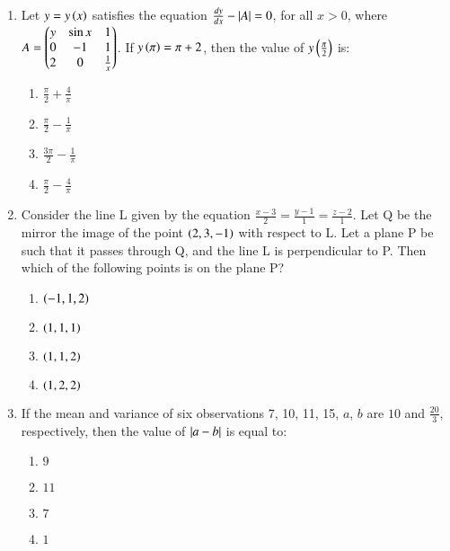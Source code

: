 \documentclass[journal]{IEEEtran}
\begin{document}
\begin{enumerate}
    \item Let $y=y\left(x\right)$ satisfies the equation $\frac{dy}{dx}-\left\vert A\right\vert=0$, for all $x>0$, where $A=\begin{pmatrix}y&\sin x & 1 \\ 0 & -1 & 1 \\ 2 & 0 & \frac{1}{x}\end{pmatrix}$. If $y\left(\pi\right)=\pi+2$, then the value of $y\left(\frac{\pi}{2}\right)$ is:

        \begin{multicols}{4}
            \begin{enumerate}
                \item $\frac{\pi}{2}+\frac{4}{\pi}$
                \item $\frac{\pi}{2}-\frac{1}{\pi}$
                \item $\frac{3\pi}{2}-\frac{1}{\pi}$
                \item $\frac{\pi}{2}-\frac{4}{\pi}$
            \end{enumerate}
        \end{multicols}

    \item Consider the line L given by the equation $\frac{x-3}{2}=\frac{y-1}{1}=\frac{z-2}{1}$. Let Q be the mirror the image of the point $\left(2,3,-1\right)$ with respect to L. Let a plane P be such that it passes through Q, and the line L is perpendicular to P. Then which of the following points is on the plane P?

    \begin{multicols}{4}
        \begin{enumerate}
            \item $\left(-1, 1, 2\right)$
            \item $\left(1, 1, 1\right)$
            \item $\left(1, 1, 2\right)$
            \item $\left(1, 2, 2\right)$
        \end{enumerate}
    \end{multicols}

    \item If the mean and variance of six observations 7, 10, 11, 15, $a$, $b$ are $10$ and $\frac{20}{3}$, respectively, then the value of $\left\vert a-b\right\vert$ is equal to:

    \begin{multicols}{4}
        \begin{enumerate}
            \item $9$
            \item $11$
            \item $7$
            \item $1$
        \end{enumerate}
    \end{multicols}
        
\end{enumerate}
\end{document}
